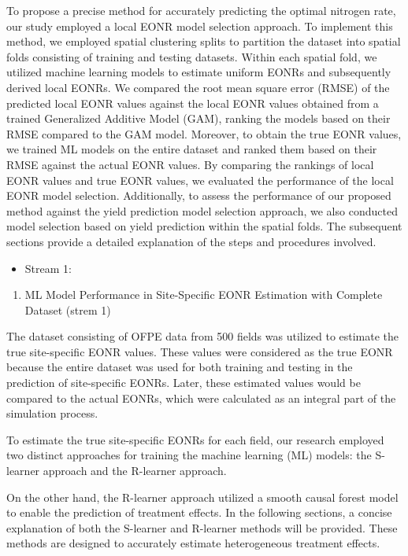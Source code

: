 \documentclass[
  12pt,
]{article}
\providecommand{\tightlist}{%
  \setlength{\itemsep}{0pt}\setlength{\parskip}{0pt}}
\begin{document}
To propose a precise method for accurately predicting the optimal nitrogen rate, our study employed a local EONR model selection approach. To implement this method, we employed spatial clustering splits to partition the dataset into spatial folds consisting of training and testing datasets. Within each spatial fold, we utilized machine learning models to estimate uniform EONRs and subsequently derived local EONRs. We compared the root mean square error (RMSE) of the predicted local EONR values against the local EONR values obtained from a trained Generalized Additive Model (GAM), ranking the models based on their RMSE compared to the GAM model. Moreover, to obtain the true EONR values, we trained ML models on the entire dataset and ranked them based on their RMSE against the actual EONR values. By comparing the rankings of local EONR values and true EONR values, we evaluated the performance of the local EONR model selection. Additionally, to assess the performance of our proposed method against the yield prediction model selection approach, we also conducted model selection based on yield prediction within the spatial folds. The subsequent sections provide a detailed explanation of the steps and procedures involved.

\begin{itemize}
\tightlist
\item
  Stream 1:
\end{itemize}

\begin{enumerate}
\def\labelenumi{\arabic{enumi}.}
\setcounter{enumi}{2}
\tightlist
\item
  ML Model Performance in Site-Specific EONR Estimation with Complete Dataset (strem 1)
\end{enumerate}

The dataset consisting of OFPE data from 500 fields was utilized to estimate the true site-specific EONR values. These values were considered as the true EONR because the entire dataset was used for both training and testing in the prediction of site-specific EONRs. Later, these estimated values would be compared to the actual EONRs, which were calculated as an integral part of the simulation process.

To estimate the true site-specific EONRs for each field, our research employed two distinct approaches for training the machine learning (ML) models: the S-learner approach and the R-learner approach.

On the other hand, the R-learner approach utilized a smooth causal forest model to enable the prediction of treatment effects.
In the following sections, a concise explanation of both the S-learner and R-learner methods will be provided. These methods are designed to accurately estimate heterogeneous treatment effects.
\end{document}
